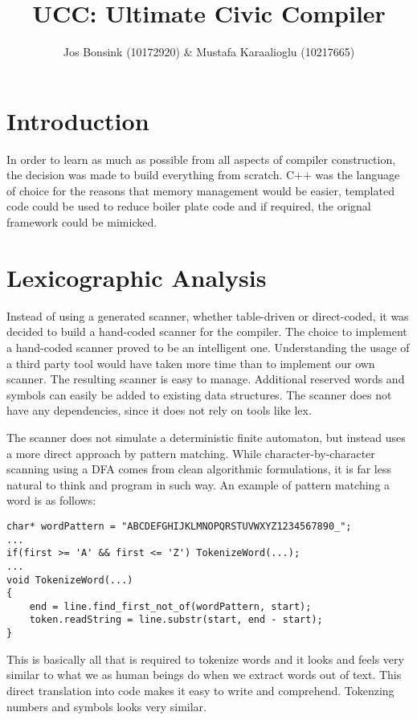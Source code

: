 \documentclass[12pt]{article}
\title{UCC: Ultimate Civic Compiler}
\author{Jos Bonsink (10172920) \& Mustafa Karaalioglu (10217665)}
\begin{document}
\maketitle

\tableofcontents
\newpage

\section{Introduction}

In order to learn as much as possible from all aspects of compiler construction, the decision was made to build everything from scratch. C++ was the language of choice for the reasons that memory management would be easier, templated code could be used to reduce boiler plate code and if required, the orignal framework could be mimicked.

\section{Lexicographic Analysis}

Instead of using a generated scanner, whether table-driven or direct-coded, it was decided to build a hand-coded scanner for the compiler. The choice to implement a hand-coded scanner proved to be an intelligent one. Understanding the usage of a third party tool would have taken more time than to implement our own scanner. The resulting scanner is easy to manage. Additional reserved words and symbols can easily be added to existing data structures. The scanner does not have any dependencies, since it does not rely on tools like lex.

The scanner does not simulate a deterministic finite automaton, but instead uses a more direct approach by pattern matching. While character-by-character scanning using a DFA comes from clean algorithmic formulations, it is far less natural to think and program in such way. An example of pattern matching a word is as follows:

\begin{lstlisting}
char* wordPattern = "ABCDEFGHIJKLMNOPQRSTUVWXYZ1234567890_";
...
if(first >= 'A' && first <= 'Z') TokenizeWord(...);
...
void TokenizeWord(...)
{
	end = line.find_first_not_of(wordPattern, start);
	token.readString = line.substr(start, end - start);
}
\end{lstlisting}

This is basically all that is required to tokenize words and it looks and feels very similar to what we as human beings do when we extract words out of text. This direct translation into code makes it easy to write and comprehend. Tokenzing numbers and symbols looks very similar.
\end{document}
